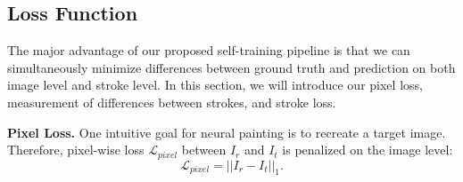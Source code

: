 \documentclass[10pt,twocolumn,letterpaper]{article}
\begin{document}
\subsection{Loss Function}\label{sec_loss}

The major advantage of our proposed self-training pipeline is that we can simultaneously minimize differences between ground truth and prediction on both image level and stroke level. In this section, we will introduce our pixel loss, measurement of differences between strokes, and stroke loss. 



\noindent
\textbf{Pixel Loss.}
One intuitive goal for neural painting is to recreate a target image.
Therefore, pixel-wise loss $\mathcal{L}_{pixel}$ between $I_r$ and $I_t$ is penalized on the image level:
\begin{equation}
    \mathcal{L}_{pixel}=\left|\left|I_r-I_t\right|\right|_1. \label{l_pixel}
\end{equation}
\end{document}
